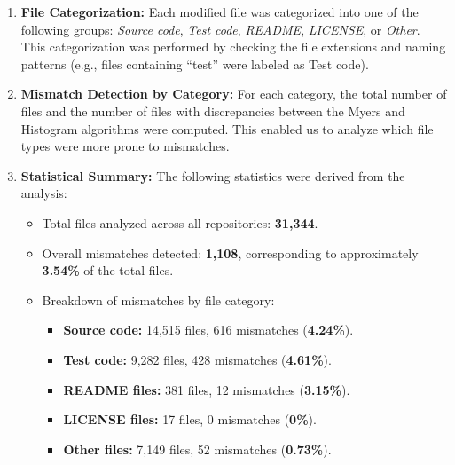 \documentclass[12pt,a4paper]{article}
\begin{document}
\begin{enumerate}
    \item \textbf{File Categorization:}  
    Each modified file was categorized into one of the following groups: 
    \textit{Source code}, \textit{Test code}, \textit{README}, \textit{LICENSE}, or \textit{Other}.  
    This categorization was performed by checking the file extensions and naming patterns (e.g., files containing ``test'' were labeled as Test code).

    \item \textbf{Mismatch Detection by Category:}  
    For each category, the total number of files and the number of files with discrepancies between the Myers and Histogram algorithms were computed. This enabled us to analyze which file types were more prone to mismatches.

    \item \textbf{Statistical Summary:}  
    The following statistics were derived from the analysis:
    \begin{itemize}
        \item Total files analyzed across all repositories: \textbf{31,344}.  
        \item Overall mismatches detected: \textbf{1,108}, corresponding to approximately \textbf{3.54\%} of the total files.  
        \item Breakdown of mismatches by file category:  
        \begin{itemize}
            \item \textbf{Source code:} 14,515 files, 616 mismatches (\textbf{4.24\%}).  
            \item \textbf{Test code:} 9,282 files, 428 mismatches (\textbf{4.61\%}).  
            \item \textbf{README files:} 381 files, 12 mismatches (\textbf{3.15\%}).  
            \item \textbf{LICENSE files:} 17 files, 0 mismatches (\textbf{0\%}).  
            \item \textbf{Other files:} 7,149 files, 52 mismatches (\textbf{0.73\%}).  
        \end{itemize}


\end{itemize}
\end{enumerate}
\end{document}
